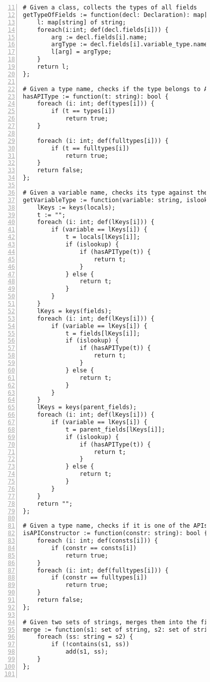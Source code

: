 \begin{figure}[ht!]
\begin{lstlisting}[numbers=left, tabsize=4, escapechar=@, caption={API Usage Mining Analysis},label={lst:aun-code}, firstline = 11, firstnumber = 11, lastline = 60]
# Given a class, collects the types of all fields
getTypeOfFields := function(decl: Declaration): map[string] of string {
    l: map[string] of string;
    foreach(i:int; def(decl.fields[i])) {
        arg := decl.fields[i].name;
        argType := decl.fields[i].variable_type.name;
        l[arg] = argType;
    }
    return l;
};

# Given a type name, checks if the type belongs to APIs of interest
hasAPIType := function(t: string): bool {
    foreach (i: int; def(types[i])) {
        if (t == types[i])
            return true;
    }
    
    foreach (i: int; def(fulltypes[i])) {
        if (t == fulltypes[i])
            return true;
    }
    return false;    
};

# Given a variable name, checks its type against the APIs of interest
getVariableType := function(variable: string, islookup: bool): string {
    lKeys := keys(locals);
    t := "";
    foreach (i: int; def(lKeys[i])) {
        if (variable == lKeys[i]) {
            t = locals[lKeys[i]];
            if (islookup) {
                if (hasAPIType(t)) {
                    return t;
                }
            } else {
                return t;
            }
        }
    }
    lKeys = keys(fields);
    foreach (i: int; def(lKeys[i])) {
        if (variable == lKeys[i]) {
            t = fields[lKeys[i]];
            if (islookup) {
                if (hasAPIType(t)) {
                    return t;
                }
            } else {
                return t;
            }
        }
    }
    lKeys = keys(parent_fields);
    foreach (i: int; def(lKeys[i])) {
        if (variable == lKeys[i]) {
            t = parent_fields[lKeys[i]];
            if (islookup) {
                if (hasAPIType(t)) {
                    return t;
                }
            } else {
                return t;
            }
        }
    }
    return "";
}; 

# Given a type name, checks if it is one of the APIs of interest
isAPIConstructor := function(constr: string): bool {
    foreach (i: int; def(consts[i])) {
        if (constr == consts[i])
            return true;
    }
    foreach (i: int; def(fulltypes[i])) {
        if (constr == fulltypes[i])
            return true;
    }
    return false;
};

# Given two sets of strings, merges them into the first set retaining only unique elements
merge := function(s1: set of string, s2: set of string) {
    foreach (ss: string = s2) {
        if (!contains(s1, ss))
            add(s1, ss);
    }
};


\end{lstlisting}
\end{figure}
